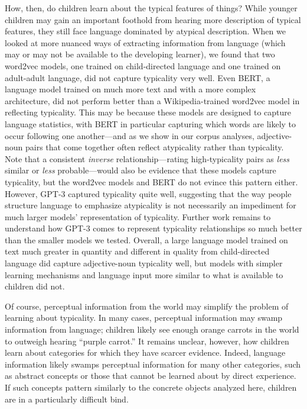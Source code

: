\documentclass{ucetd}
\begin{document}
How, then, do children learn about the typical features of things? While
younger children may gain an important foothold from hearing more
description of typical features, they still face language dominated by
atypical description. When we looked at more nuanced ways of extracting
information from language (which may or may not be available to the
developing learner), we found that two word2vec models, one trained on
child-directed language and one trained on adult-adult language, did not
capture typicality very well. Even BERT, a language model trained on
much more text and with a more complex architecture, did not perform
better than a Wikipedia-trained word2vec model in reflecting typicality.
This may be because these models are designed to capture language
statistics, with BERT in particular capturing which words are likely to
occur following one another---and as we show in our corpus analyses,
adjective-noun pairs that come together often reflect atypicality rather
than typicality. Note that a consistent \emph{inverse}
relationship---rating high-typicality pairs as \emph{less} similar or
\emph{less} probable---would also be evidence that these models capture
typicality, but the word2vec models and BERT do not evince this pattern
either. However, GPT-3 captured typicality quite well, suggesting that
the way people structure language to emphasize atypicality is not
necessarily an impediment for much larger models' representation of
typicality. Further work remains to understand how GPT-3 comes to
represent typicality relationships so much better than the smaller
models we tested. Overall, a large language model trained on text much
greater in quantity and different in quality from child-directed
language did capture adjective-noun typicality well, but models with
simpler learning mechanisms and language input more similar to what is
available to children did not.

Of course, perceptual information from the world may simplify the
problem of learning about typicality. In many cases, perceptual
information may swamp information from language; children likely see
enough orange carrots in the world to outweigh hearing ``purple
carrot.'' It remains unclear, however, how children learn about
categories for which they have scarcer evidence. Indeed, language
information likely swamps perceptual information for many other
categories, such as abstract concepts or those that cannot be learned
about by direct experience. If such concepts pattern similarly to the
concrete objects analyzed here, children are in a particularly difficult
bind.
\end{document}
